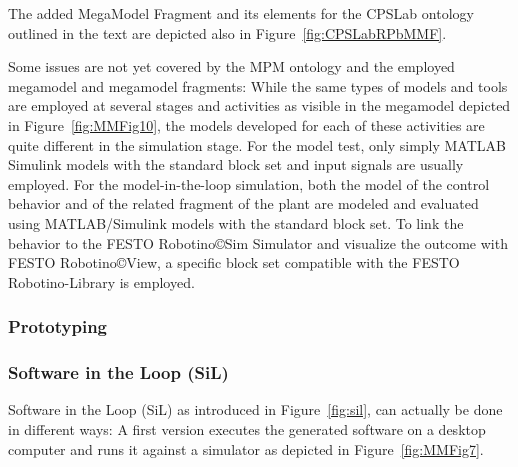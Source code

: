 The added MegaModel Fragment \CPSLabRPbMMF and its elements for the CPSLab ontology outlined in the text are depicted also in Figure~\ref{fig:CPSLabRPbMMF}.




%
Some issues are not yet covered by the MPM ontology and the employed megamodel and megamodel fragments: 
%
While the same types of models and tools are employed at several stages and activities as visible in the megamodel depicted in Figure~\ref{fig:MMFig10}, the models developed for each of these activities are quite different in the simulation stage.
%
For the model test, only simply MATLAB Simulink models with the standard block set and input signals are usually employed. 
%
For the model-in-the-loop simulation, both the model of the control behavior and of the related fragment of the plant are modeled and evaluated using MATLAB/Simulink models with the standard block set.
%
To link the behavior to the FESTO Robotino{\copyright}Sim Simulator and visualize the outcome with FESTO Robotino{\copyright}View, a specific block set compatible with the FESTO Robotino-Library is employed.






\subsubsection{Prototyping}
%


\subsubsection{Software in the Loop (SiL)}
%
Software in the Loop (SiL) as introduced in Figure~\ref{fig:sil}, can actually be done in different ways:
%
A first version executes the generated software on a desktop computer and runs it against a simulator as depicted in Figure~\ref{fig:MMFig7}.

